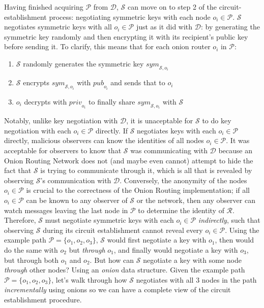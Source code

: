 \documentclass[10pt]{report}
\begin{document}
Having finished acquiring $\mathcal{P}$ from $\mathcal{D}$, $\mathcal{S}$ can move on to step 2 of the
circuit-establishment process: negotiating symmetric keys with each node $o_i \in \mathcal{P}$.
$\mathcal{S}$ negotiates symmetric keys with all $o_i \in \mathcal{P}$ just as it did with $\mathcal{D}$:
by generating the symmetric key randomly and then encrypting it with its recipient's public key before
sending it.  To clarify, this means that for each onion router $o_i$ in $\mathcal{P}$:
\begin{enumerate}
    \item $\mathcal{S}$ randomly generates the symmetric key $\mathit{sym}_{\mathcal{S},o_i}$
    \item $\mathcal{S}$ encrypts $\mathit{sym}_{\mathcal{S},o_i}$ with $\mathit{pub}_{o_i}$ and
        sends that to $o_i$
    \item $o_i$ decrypts with $\mathit{priv}_{o_i}$ to finally share $\mathit{sym}_{\mathcal{S},o_i}$ with
        $\mathcal{S}$
\end{enumerate}
Notably, unlike key negotiation with $\mathcal{D}$, it is unaceptable for $\mathcal{S}$ to do key negotiation
with each $o_i \in \mathcal{P}$ directly.  If $\mathcal{S}$ negotiates keys with each $o_i \in \mathcal{P}$
directly, malicious observers can know the identities of all nodes $o_i \in \mathcal{P}$.  It was acceptable
for observers to know that $\mathcal{S}$ was communicating with $\mathcal{D}$ because an Onion Routing
Network does not (and maybe even cannot) attempt to hide the fact that $\mathcal{S}$ is trying to
communicate through it, which is all that is revealed by observing $\mathcal{S}$'s communication with
$\mathcal{D}$.  Conversely, the anonymity of the nodes $o_i \in \mathcal{P}$ is crucial to the correctness
of the Onion Routing implementation; if all $o_i \in \mathcal{P}$ can be known to any observer of
$\mathcal{S}$ or the network, then any observer can watch messages leaving the last node in $\mathcal{P}$
to determine the identity of $\mathcal{R}$.\\

Therefore, $\mathcal{S}$ must negotiate symmetric keys with each $o_i \in \mathcal{P}$ \textit{indirectly},
such that observing $\mathcal{S}$ during its circuit establishment cannot reveal every $o_i \in \mathcal{P}$.
Using the example path $\mathcal{P} = \{o_1, o_2, o_3\}$, $\mathcal{S}$ would first negotiate a key with $o_1$,
then would do the same with $o_2$ but \textit{through} $o_1$, and finally would negotiate a key with $o_3$, but
through both $o_1$ and $o_2$.  But how can $\mathcal{S}$ negotiate a key with some node \textit{through} other
nodes? Using an \textit{onion} data structure. Given the example path $\mathcal{P} = \{o_1, o_2, o_3\}$,
let's walk through how $\mathcal{S}$ negotiates with all 3 nodes in the path \textit{incrementally} using onions
so we can have a complete view of the circuit establishment procedure.\\
\end{document}
